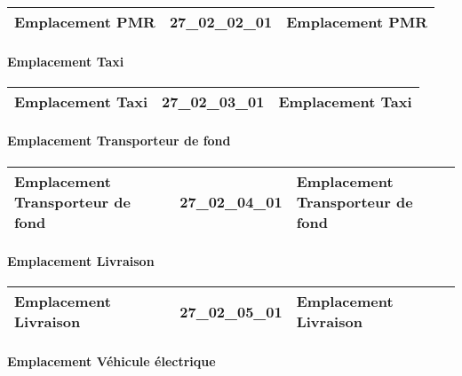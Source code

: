 \documentclass[12pt,titlepage]{book}
\begin{document}
\renewcommand{\arraystretch}{1.2}
\begin{supertabular}{|p{10cm}|c|p{15cm}|}
 Emplacement PMR & 27\_02\_02\_01 & Emplacement PMR\\
\hline
\end{supertabular}


\paragraph{Emplacement Taxi}
\noindent
\vspace{\baselineskip}

\renewcommand{\arraystretch}{1.2}
\begin{supertabular}{|p{10cm}|c|p{15cm}|}
 Emplacement Taxi & 27\_02\_03\_01 & Emplacement Taxi\\
\hline
\end{supertabular}


\paragraph{Emplacement Transporteur de fond}
\noindent
\vspace{\baselineskip}

\renewcommand{\arraystretch}{1.2}
\begin{supertabular}{|p{10cm}|c|p{15cm}|}
 Emplacement Transporteur de fond & 27\_02\_04\_01 & Emplacement Transporteur de fond\\
\hline
\end{supertabular}


\paragraph{Emplacement Livraison}
\noindent
\vspace{\baselineskip}

\renewcommand{\arraystretch}{1.2}
\begin{supertabular}{|p{10cm}|c|p{15cm}|}
 Emplacement Livraison & 27\_02\_05\_01 & Emplacement Livraison\\
\hline
\end{supertabular}


\paragraph{Emplacement Véhicule électrique}
\noindent
\vspace{\baselineskip}
\end{document}
